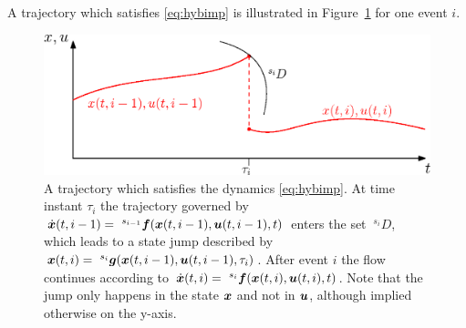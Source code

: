 \documentclass[../DC2017114Bouma.tex]{subfiles}
\begin{document}
A trajectory which satisfies \eqref{eq:hybimp} is illustrated in Figure~\ref{fig:hybimptraj} for one event $i$.

\begin{figure}[h]
\centering
\includegraphics[width=.8\textwidth]{hybimptraj.eps}\caption{A trajectory which satisfies the dynamics \eqref{eq:hybimp}. At time instant $\tau_i$ the trajectory governed by $\dot{{\boldsymbol{x}}}(t,i-1) =\ ^{s_{i-1}}{\boldsymbol{f}}({\boldsymbol{x}}(t,i-1),{\boldsymbol{u}}(t,i-1),t)$ enters the set $\ ^{s_i}D$, which leads to a state jump described by $\xb(t,i) = \ ^{s_i}\gb(\xb(t,i-1),\ub(t,i-1),\tau_i)$. After event $i$ the flow continues according to $\dot{\xb}(t,i) =\ ^{s_i}\fb(\xb(t,i),\ub(t,i),t)$. Note that the jump only happens in the state ${\boldsymbol{x}}$ and not in ${\boldsymbol{u}}$, although implied otherwise on the y-axis.} \label{fig:hybimptraj}
\end{figure}
%
\end{document}

